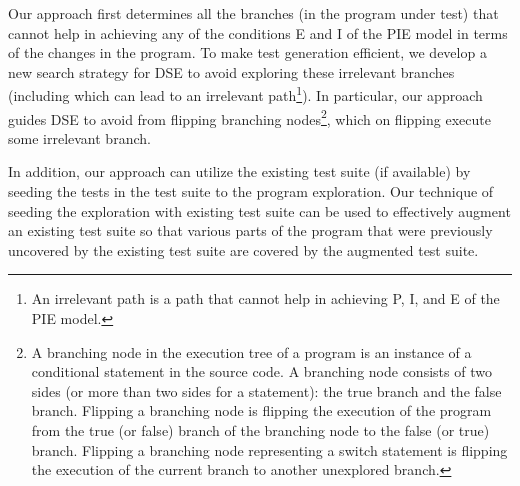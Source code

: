 Our approach first determines all the branches (in the program under test) that cannot help in achieving any of the conditions E and I of the PIE model in terms of the changes in the program. To make test generation efficient, we develop a new search strategy for DSE to avoid exploring these irrelevant branches (including which can lead to an irrelevant path\footnote{An irrelevant path is a path that cannot help in achieving P, I, and E of the PIE model.}). In particular, our approach guides DSE to avoid from flipping branching nodes\footnote{A branching node in the execution tree of a program is an instance of a conditional statement in the source code. A branching node consists of two sides (or more than two sides for a  statement): the true branch and the false branch. Flipping a branching node is flipping the execution of the program from the true (or false) branch of the branching node to the false (or true) branch. Flipping a branching node representing a switch statement is flipping the execution of the current branch to another unexplored branch.}, which on flipping execute some irrelevant branch. 

In addition, our approach can utilize the existing test suite (if available) by seeding the tests in the test suite to the program exploration. Our technique of seeding the exploration with existing test suite can be used to effectively augment an existing test suite so that various parts of the program that were previously uncovered by the existing test suite are covered by the augmented test suite. 


